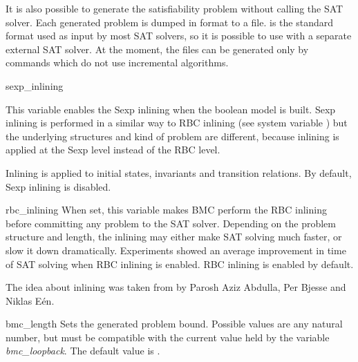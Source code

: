 It is also possible to generate the satisfiability problem without
calling the SAT solver. Each generated problem is dumped in
\dimacs format to a file. \dimacs is the standard format used as input
by most SAT solvers, so it is possible to use \nusmv with a separate
external SAT solver. At the moment, the \dimacs files can be generated only by
commands which do not use incremental algorithms.




\begin{nusmvVar} {sexp\_inlining}{}{}

This variable enables the Sexp inlining when the boolean
model is built. Sexp inlining is performed in a similar way to RBC
inlining (see system variable
) but the underlying 
structures and kind of problem are different, because inlining is applied 
at the Sexp level instead of the RBC level.

Inlining is applied to initial states, invariants and transition
relations. By default, Sexp inlining is disabled.
\end{nusmvVar}

\begin{nusmvVar} {rbc\_inlining}{}{}
When set, this variable makes BMC perform the RBC inlining before
committing any problem to the SAT solver. Depending on the problem
structure and length, the inlining may either make SAT solving
much faster, or slow it down dramatically.
Experiments showed an average improvement in time of SAT solving
when RBC inlining is enabled. RBC inlining is enabled by default.

The idea about inlining was taken from \cite{abdulla00symbolic} by
Parosh Aziz Abdulla, Per Bjesse and Niklas E\'en.
\end{nusmvVar}











\begin{nusmvVar} {bmc\_length}{}{}
Sets the generated problem bound. Possible values are any natural
number, but must be compatible with the current value held by the
variable \emph{bmc\_loopback}. The default value is .
\end{nusmvVar}

